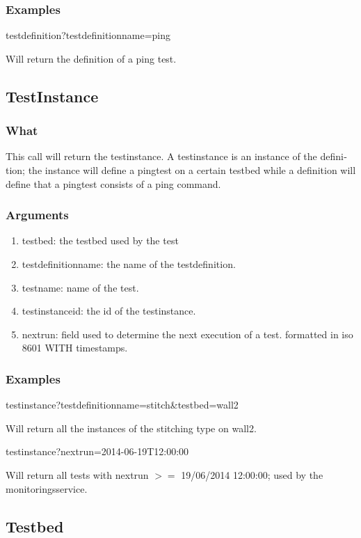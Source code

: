 \begin{otherlanguage}{english}
\subsubsection{Examples}
\begin{lt}
testdefinition?testdefinitionname=ping
\end{lt}
Will return the definition of a ping test.
\\
\subsection{TestInstance}
\subsubsection{What}
This call will return the testinstance. A testinstance is an instance of the definition; the instance will define a pingtest on a certain testbed while a definition will define that a pingtest consists of a ping command. 
\subsubsection{Arguments}
\begin{enumerate}
\item testbed: the testbed used by the test
\item testdefinitionname: the name of the testdefinition.
\item testname: name of the test.
\item testinstanceid: the id of the testinstance.
\item nextrun: field used to determine the next execution of a test. formatted in iso 8601 WITH timestamps.
\end{enumerate}
\clearpage
\subsubsection{Examples}
\begin{lt}
testinstance?testdefinitionname=stitch&testbed=wall2
\end{lt}
Will return all the instances of the stitching type on wall2.
\begin{lt}
testinstance?nextrun=2014-06-19T12:00:00
\end{lt}
Will return all tests with nextrun $>=$ 19/06/2014 12:00:00; used by the monitoringsservice.\\

\subsection{Testbed}

\end{otherlanguage}
